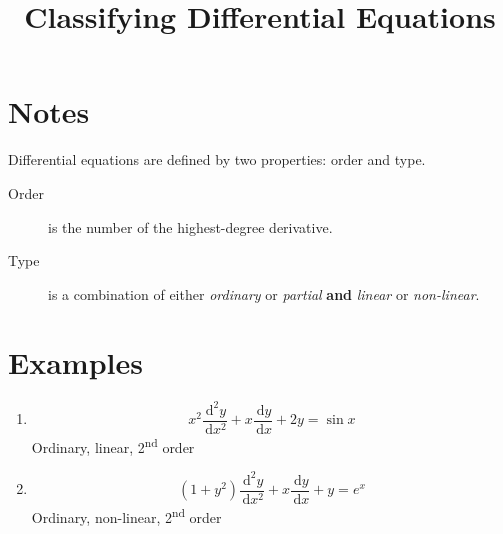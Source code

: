 \documentclass{article}
\title{Classifying Differential Equations}
\date{}
\author{}
\newcommand{\ud}{\, \mathrm{d}}
\begin{document}
\maketitle
\section{Notes}
\noindent
Differential equations are defined by two properties: order and type.
\begin{description}
\item[Order] is the number of the highest-degree derivative.
\item[Type] is a combination of either \emph{ordinary} or \emph{partial}
\textbf{and} \emph{linear} or \emph{non-linear}.
\end{description}
\section{Examples}
\begin{enumerate}
\item \begin{equation} 
x^2\frac{\ud^2 y}{\ud x^2} + x\frac{\ud y}{\ud x} + 2y = \sin x 
\end{equation}
\indent Ordinary, linear, 2\textsuperscript{nd} order
\item \begin{equation}
(1 + y^2)\frac{\ud^2 y}{\ud x^2} + x\frac{\ud y}{\ud x} + y = e^x 
\end{equation}
\indent Ordinary, non-linear, 2\textsuperscript{nd} order
\end{enumerate}
\end{document}
